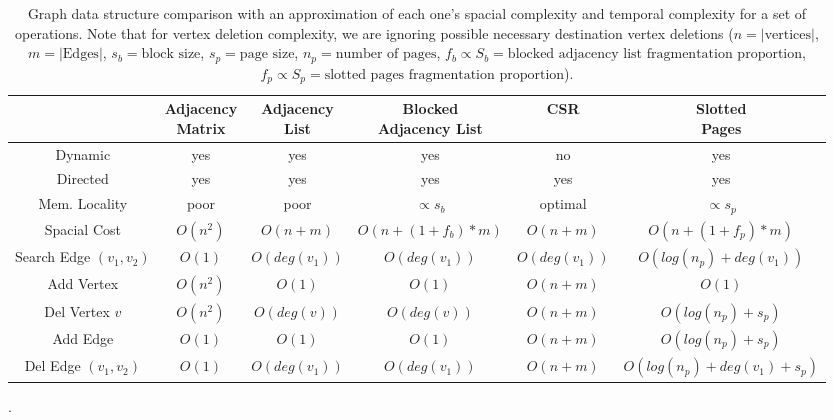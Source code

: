 




    \begin{table}[tbp]
        \scriptsize
        \centering
        \begin{tabular}{| c | c c c c c |}
            \hline
              & \makecell{Adjacency \\ Matrix} & \makecell{Adjacency \\ List} & \makecell{Blocked \\ Adjacency List} & CSR & \makecell{Slotted \\ Pages} \\
            \hline
            \hline
            Dynamic & yes & yes & yes & no & yes \\
            Directed & yes & yes & yes & yes & yes \\
            Mem. Locality & poor & poor & $\propto s_b$ & optimal & $\propto s_p$ \\
            Spacial Cost & $O(n^2)$ & $O(n+m)$ & $O(n+(1+f_b)*m)$ & $O(n+m)$ & $O(n+(1+f_p)*m)$ \\
            Search Edge $(v_1,v_2)$ & $O(1)$ & $O(deg(v_1))$ & $O(deg(v_1))$ & $O(deg(v_1))$ & $O(log(n_p) + deg(v_1))$ \\ 
            Add Vertex & $O(n^2)$ & $O(1)$ & $O(1)$ & $O(n+m)$\* & $O(1)$ \\ 
            Del Vertex $v$ & $O(n^2)$ & $O(deg(v))$ & $O(deg(v))$ & $O(n+m)$ & $O(log(n_p) + s_p)$ \\
            Add Edge & $O(1)$ & $O(1)$ & $O(1)$ & $O(n+m)$ & $O(log(n_p) + s_p)$ \\
            Del Edge $(v_1, v_2)$ & $O(1)$ & $O(deg(v_1))$ & $O(deg(v_1))$ & $O(n+m)$ & $O(log(n_p) + deg(v_1) + s_p)$ \\
            
            \hline
        \end{tabular}
        \caption{Graph data structure comparison with an approximation of each one's spacial complexity and temporal complexity for a set of operations. Note that for vertex deletion complexity, we are ignoring possible necessary destination vertex deletions ($n = |\text{vertices}|$, $m = |\text{Edges}|$, $s_b = \text{block size}$, $s_p = \text{page size}$, $n_p = \text{number of pages}$, $f_b \propto S_b = \text{blocked adjacency list fragmentation proportion}$, $f_p \propto S_p = \text{slotted pages fragmentation proportion}$).}
        \label{tab:graph_data_structures}.
    \end{table}
    
